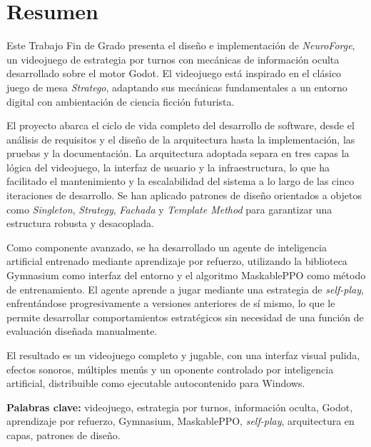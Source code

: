 \chapter*{Resumen}

Este Trabajo Fin de Grado presenta el diseño e implementación de \textit{NeuroForge}, un videojuego de estrategia por turnos con mecánicas de información oculta desarrollado sobre el motor Godot. El videojuego está inspirado en el clásico juego de mesa \textit{Stratego}, adaptando sus mecánicas fundamentales a un entorno digital con ambientación de ciencia ficción futurista.

El proyecto abarca el ciclo de vida completo del desarrollo de software, desde el análisis de requisitos y el diseño de la arquitectura hasta la implementación, las pruebas y la documentación. La arquitectura adoptada separa en tres capas la lógica del videojuego, la interfaz de usuario y la infraestructura, lo que ha facilitado el mantenimiento y la escalabilidad del sistema a lo largo de las cinco iteraciones de desarrollo. Se han aplicado patrones de diseño orientados a objetos como \textit{Singleton}, \textit{Strategy}, \textit{Fachada} y \textit{Template Method} para garantizar una estructura robusta y desacoplada.

Como componente avanzado, se ha desarrollado un agente de inteligencia artificial entrenado mediante aprendizaje por refuerzo, utilizando la biblioteca Gymnasium como interfaz del entorno y el algoritmo MaskablePPO como método de entrenamiento. El agente aprende a jugar mediante una estrategia de \textit{self-play}, enfrentándose progresivamente a versiones anteriores de sí mismo, lo que le permite desarrollar comportamientos estratégicos sin necesidad de una función de evaluación diseñada  manualmente.

El resultado es un videojuego completo y jugable, con una interfaz visual pulida, efectos sonoros, múltiples menús y un oponente controlado por inteligencia artificial, distribuible como ejecutable autocontenido para Windows.

\vspace{0.5cm}
\noindent \textbf{Palabras clave:} videojuego, estrategia por turnos, información oculta, Godot, aprendizaje por refuerzo, Gymnasium, MaskablePPO, \textit{self-play}, arquitectura en capas, patrones de diseño.






